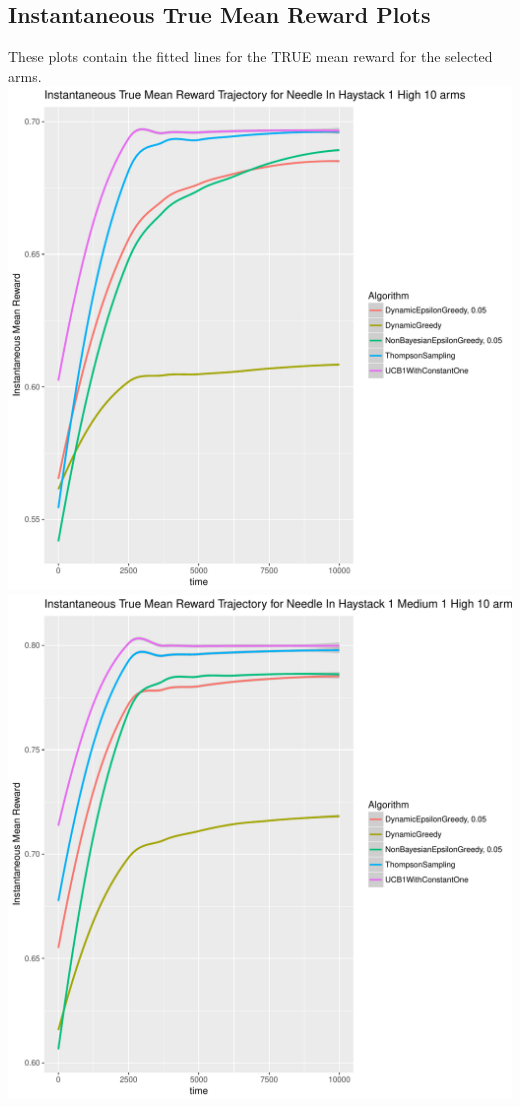 \documentclass[11pt,letterpaper]{article}
\begin{document}
\subsection*{Instantaneous True Mean Reward Plots}
These plots contain the fitted lines for the TRUE mean reward for the selected arms. \\
\includegraphics[scale=0.5]{"../results/preliminary_figures/Instantaneous True Mean Reward Trajectory for Needle In Haystack 1 High 10 arms"} \\
\includegraphics[scale=0.5]{"../results/preliminary_figures/Instantaneous True Mean Reward Trajectory for Needle In Haystack 1 Medium 1 High 10 arms"} \\
\end{document}
